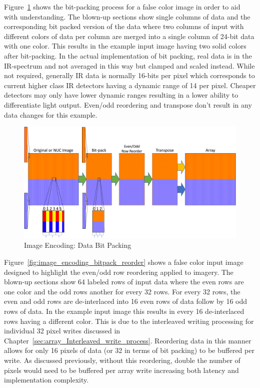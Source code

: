     Figure~\ref{fig:image_encoding_bitback} shows the bit-packing process for a false color image in order to aid with understanding. The blown-up sections show single columns of data and the corresponding bit packed version of the data where two columns of input with different colors of data per column are merged into a single column of 24-bit data with one color. This results in the example input image having two solid colors after bit-packing. In the actual implementation of bit packing, real data is in the IR-spectrum and not averaged in this way but clamped and scaled instead. While not required, generally IR data is normally 16-bits per pixel which corresponds to current higher class IR detectors having a dynamic range of 14 per pixel\cite{FLIR2014_1, FLIR2014_2, FLIR2016}. Cheaper detectors may only have lower dynamic ranges resulting in a lower ability to differentiate light output. Even/odd reordering and transpose don't result in any data changes for this example.

    \begin{figure}
        \centering
        \includegraphics[width=1.0\textwidth]{fig/image_encoding_bitback.pdf}
        \caption{Image Encoding: Data Bit Packing}
        \label{fig:image_encoding_bitback}
    \end{figure}

    Figure~\ref{fig:image_encoding_bitpack_reorder} shows a false color input image designed to highlight the even/odd row reordering applied to imagery. The blown-up sections show 64 labeled rows of input data where the even rows are one color and the odd rows another for every 32 rows. For every 32 rows, the even and odd rows are de-interlaced into 16 even rows of data follow by 16 odd rows of data. In the example input image this results in every 16 de-interlaced rows having a different color. This is due to the interleaved writing processing for individual 32 pixel writes discussed in Chapter~\ref{sec:array_Interleaved_write_process}. Reordering data in this manner allows for only 16 pixels of data (or 32 in terms of bit packing) to be buffered per write. As discussed previously, without this reordering, double the number of pixels would need to be buffered per array write increasing both latency and implementation complexity.

